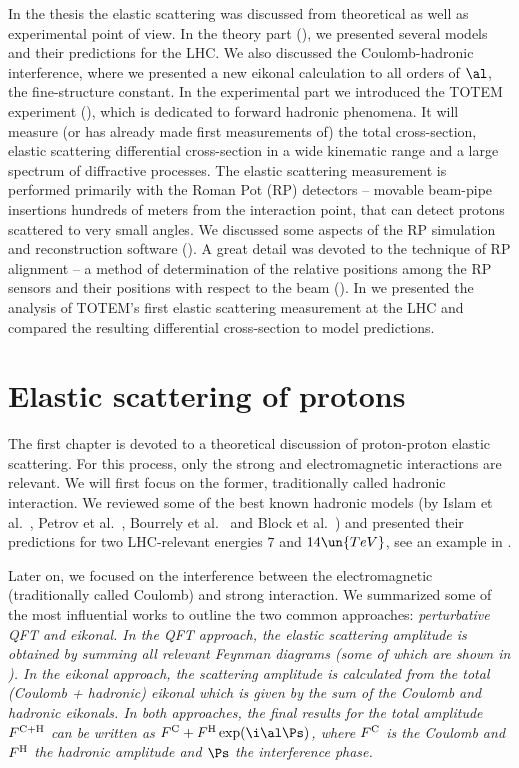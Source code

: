 In the thesis the elastic scattering was discussed from theoretical as well as experimental point of view. In the theory part (), we presented several models and their predictions for the LHC. We also discussed the Coulomb-hadronic interference, where we presented a new eikonal calculation to all orders of $\al$, the fine-structure constant. In the experimental part we introduced the TOTEM experiment (), which is dedicated to forward hadronic phenomena. It will measure (or has already made first measurements of) the total cross-section, elastic scattering differential cross-section in a wide kinematic range and a large spectrum of diffractive processes. The elastic scattering measurement is performed primarily with the Roman Pot (RP) detectors -- movable beam-pipe insertions hundreds of meters from the interaction point, that can detect protons scattered to very small angles. We discussed some aspects of the RP simulation and reconstruction software (). A great detail was devoted to the technique of RP alignment -- a method of determination of the relative positions among the RP sensors and their positions with respect to the beam (). In  we presented the analysis of TOTEM's first elastic scattering measurement at the LHC and compared the resulting differential cross-section to model predictions.


\chapter[el]{Elastic scattering of protons}


The first chapter is devoted to a theoretical discussion of proton-proton elastic scattering. For this process, only the strong and electromagnetic interactions are relevant. We will first focus on the former, traditionally called hadronic interaction. We reviewed some of the best known hadronic models (by Islam et al.~, Petrov et al.~, Bourrely et al.~ and Block et al.~) and presented their predictions for two LHC-relevant energies $7$ and $14\un{TeV}$, see an example in .

Later on, we focused on the interference between the electromagnetic (traditionally called Coulomb) and strong interaction. We summarized some of the most influential works to outline the two common approaches: \em{perturbative QFT} and \em{eikonal}. In the QFT approach, the elastic scattering amplitude is obtained by summing all relevant Feynman diagrams (some of which are shown in ). In the eikonal approach, the scattering amplitude is calculated from the total (Coulomb + hadronic) eikonal which is given by the sum of the Coulomb and hadronic eikonals. In both approaches, the final results for the total amplitude $F^{\rm C+H}$ can be written as $\FC + \FH \exp(\i\al\Ps)$, where $F^{\rm C}$ is the Coulomb and $F^{\rm H}$ the hadronic amplitude and $\Ps$ the \em{interference phase}.

